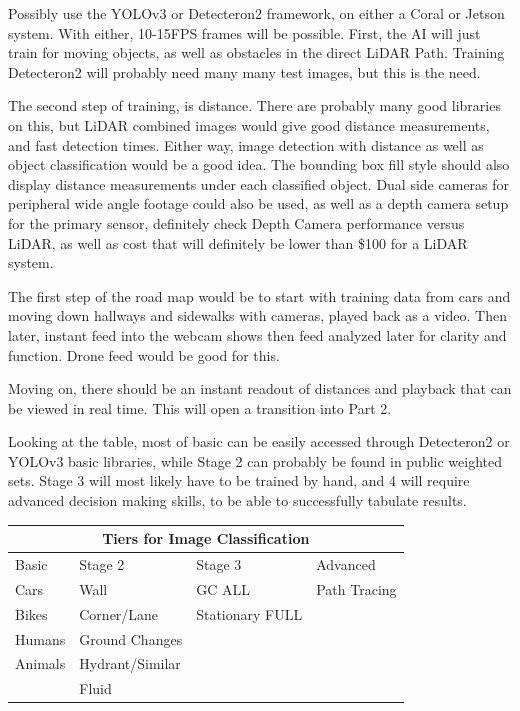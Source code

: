 \documentclass{article}
\begin{document}
Possibly use the YOLOv3 or Detecteron2 framework, on either a Coral or Jetson system. With either, 10-15FPS frames will be possible. First, the AI will just train for moving objects, as well as obstacles in the direct LiDAR Path. Training Detecteron2 will probably need many many test images, but this is the need. 

The second step of training, is distance. There are probably many good libraries on this, but LiDAR combined images would give good distance measurements, and fast detection times. Either way, image detection with distance as well as object classification would be a good idea. The bounding box fill style should also display distance measurements under each classified object. Dual side cameras for peripheral wide angle footage could also be used, as well as a depth camera setup for the primary sensor, definitely check Depth Camera performance versus LiDAR, as well as cost that will definitely be lower than \$100 for a LiDAR system. 

The first step of the road map would be to start with training data from cars and moving down hallways and sidewalks with cameras, played back as a video. Then later, instant feed into the webcam shows then feed analyzed later for clarity and function. Drone feed would be good for this. 

Moving on, there should be an instant readout of distances and playback that can be viewed in real time. This will open a transition into Part 2.

Looking at the table, most of basic can be easily accessed through Detecteron2 or YOLOv3 basic libraries, while Stage 2 can probably be found in public weighted sets. Stage 3 will most likely have to be trained by hand, and 4 will require advanced decision making skills, to be able to successfully tabulate results. 


\begin{tabular}{ |p{1.7cm}|p{2.8cm}|p{2.8cm}|p{2.5cm}|  }
    \hline
    \multicolumn{4}{|c|}{Tiers for Image Classification} \\
    \hline
    Basic & Stage 2 & Stage 3 & Advanced\\
    \hline
    Cars            & Wall              & GC ALL            & Path Tracing\\
    Bikes           & Corner/Lane       & Stationary FULL   & \\
    Humans          & Ground Changes    &                   & \\
    Animals         & Hydrant/Similar   &                   & \\
                    & Fluid             &                   & \\

    \hline
\end{tabular}
\end{document}
